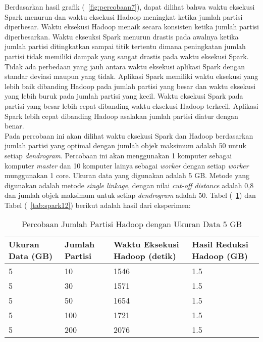 Berdasarkan hasil grafik (~\ref{fig:percobaan7}), dapat dilihat bahwa waktu eksekusi Spark menurun dan waktu eksekusi Hadoop meningkat ketika jumlah partisi diperbesar. Waktu eksekusi Hadoop menaik secara konsisten ketika jumlah partisi diperbesarkan. Waktu ekseuksi Spark menurun drastis pada awalnya ketika jumlah partisi ditingkatkan sampai titik tertentu dimana peningkatan jumlah partisi tidak memiliki dampak yang sangat drastis pada waktu eksekusi Spark. Tidak ada perbedaan yang jauh antara waktu eksekusi aplikasi Spark dengan standar deviasi maupun yang tidak. Aplikasi Spark memiliki waktu eksekusi yang lebih baik dibanding Hadoop pada jumlah partisi yang besar dan waktu eksekusi yang lebih buruk pada jumlah partisi yang kecil. Waktu eksekusi Spark pada partisi yang besar lebih cepat dibanding waktu eksekusi Hadoop terkecil. Aplikasi Spark lebih cepat dibanding Hadoop asalakan jumlah partisi diatur dengan benar.\\







Pada percobaan ini akan dilihat waktu eksekusi Spark dan Hadoop berdasarkan jumlah partisi yang optimal dengan jumlah objek maksimum adalah 50 untuk setiap \textit{dendrogram}. Percobaan ini akan menggunakan 1 komputer sebagai komputer \textit{master} dan 10 komputer lainya sebagai \textit{worker} dengan setiap \textit{worker} munggunakan 1 core. Ukuran data yang digunakan adalah 5 GB. Metode yang digunakan adalah metode \textit{single linkage}, dengan nilai \textit{cut-off distance} adalah 0,8 dan jumlah objek maksimum untuk setiap \textit{dendrogram} adalah 50. Tabel (~\ref{tab:spark11}) dan Tabel (~\ref{tab:spark12}) berikut adalah hasil dari eksperimen:





\begin{table}[H] 
	\centering 
	\caption{Percobaan Jumlah Partisi Hadoop dengan Ukuran Data 5 GB}
	\label{tab:spark11}
	\begin{tabular}{|p{3cm}|p{3cm}|p{4cm}|p{4cm}|}
\hline
Ukuran Data (GB) & Jumlah Partisi &  Waktu Eksekusi Hadoop (detik) & Hasil Reduksi Hadoop (GB)\\
\hline
5 & 10 & 1546  & 1.5  \\
\hline
5 & 30 & 1571  & 1.5  \\
\hline
5 & 50 & 1654  & 1.5   \\
\hline
5 & 100 & 1721 & 1.5   \\
\hline
5 & 200 & 2076  & 1.5   \\
\hline


\hline

	\end{tabular} 
\end{table}






